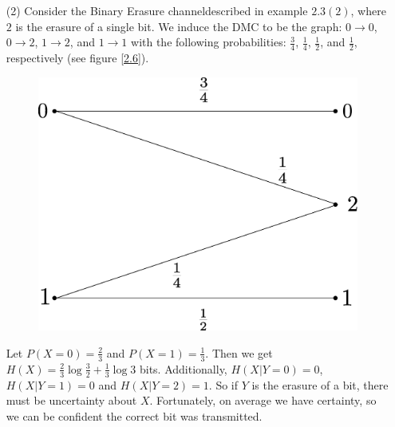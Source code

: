 \begin{example}
\begin{enumerate}
        \item[(2)] Consider the Binary Erasure channeldescribed in example
            $2.3(2)$, where $2$ is the erasure of a single bit. We induce the
            DMC to be the graph: $0 \rightarrow 0$, $0 \rightarrow 2$, $1
            \rightarrow 2$, and $1 \rightarrow 1$ with the following
            probabilities: $\frac{3}{4}$, $\frac{1}{4}$, $\frac{1}{2}$, and
            $\frac{1}{2}$, respectively (see figure \ref{2.6}).
            \begin{figure}
                \centering
                \includegraphics[scale=0.2]{Figures/Chapter2/bec_1.eps}
                \caption{}
                \label{fig_2.6}
            \end{figure}
            Let $P(X=0)=\frac{2}{3}$ and $P(X=1)=\frac{1}{3}$. Then we get
            $H(X)=\frac{2}{3}\log{\frac{3}{2}}+\frac{1}{3}\log{3}$ bits.
            Additionally, $H(X|Y=0)=0$, $H(X|Y=1)=0$ and $H(X|Y=2)=1$. So if $Y$
            is the erasure of a bit, there must be uncertainty about  $X$.
            Fortunately, on average we have certainty, so we can be confident
            the correct bit was transmitted.
    \end{enumerate}
\end{example}

